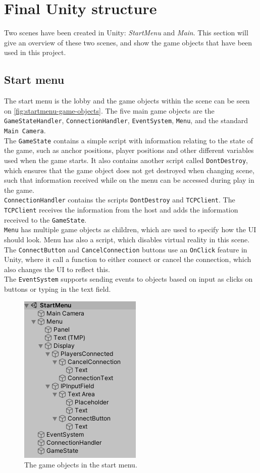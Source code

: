 \section{Final Unity structure}
Two scenes have been created in Unity: \textit{StartMenu} and \textit{Main}.
This section will give an overview of these two scenes, and show the game objects that have been used in this project.

\subsection{Start menu}
The start menu is the lobby and the game objects within the scene can be seen on \autoref{fig:startmenu-game-objects}.
The five main game objects are the \texttt{GameStateHandler}, \texttt{ConnectionHandler}, \texttt{EventSystem}, \texttt{Menu}, and the standard \texttt{Main Camera}.
\\
The \texttt{GameState} contains a simple script with information relating to the state of the game, such as anchor positions, player positions and other different variables used when the game starts.
It also contains another script called \texttt{DontDestroy}, which ensures that the game object does not get destroyed when changing scene, such that information received while on the menu can be accessed during play in the game.
\\
\texttt{ConnectionHandler} contains the scripts \texttt{DontDestroy} and \texttt{TCPClient}.
The \texttt{TCPClient} receives the information from the host and adds the information received to the \texttt{GameState}.
\\
\texttt{Menu} has multiple game objects as children, which are used to specify how the UI should look.
Menu has also a script, which disables virtual reality in this scene.
The \texttt{ConnectButton} and \texttt{CancelConnection} buttons use an \texttt{OnClick} feature in Unity, where it call a function to either connect or cancel the connection, which also changes the UI to reflect this.
\\
The \texttt{EventSystem} supports sending events to objects based on input as clicks on buttons or typing in the text field.

\begin{figure}[H]
    \centering
    \includegraphics[width=0.4\linewidth]{figures/startmenu.PNG}
    \caption{The game objects in the start menu.}
    \label{fig:startmenu-game-objects}
\end{figure}

